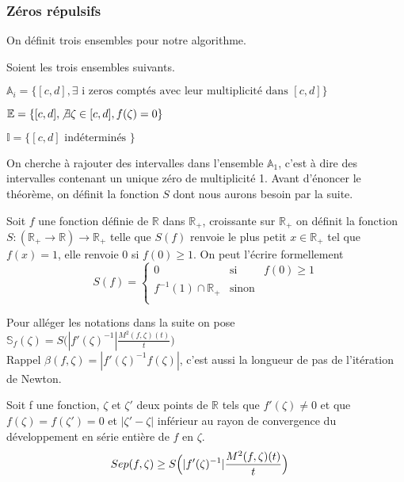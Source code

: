 \documentclass[a4paper,10.5pt]{article}
\begin{document}
	
	\subsubsection{Zéros répulsifs}
	On définit trois ensembles pour notre algorithme.
	\begin{definition} Soient les trois ensembles suivants.
		
	$\mathbb{A}_i=\{[c,d], \exists \text{ i zeros comptés avec leur multiplicité dans } [c,d]\}$
	
	$\mathbb{E}=\{[c,d], \not\exists \zeta \in [c,d], f(\zeta)=0\}$
	
	$\mathbb{I}=\{[c,d] \text{ indéterminés }\}$\\
	\end{definition}

	\noindent On cherche à rajouter des intervalles dans l'ensemble $\mathbb{A}_1$, c'est à dire des intervalles contenant un unique zéro de multiplicité 1.
	Avant d'énoncer le théorème, on définit la fonction $S$ dont nous aurons besoin par la suite. 
	\begin{definition} Soit $f$ une fonction définie de $\mathbb{R}$ dans $\mathbb{R}_+$, croissante sur $\mathbb{R}_+$ on définit la fonction $S:(\mathbb{R}_+ \rightarrow \mathbb{R}) \longrightarrow \mathbb{R}_+$  telle que $S(f)$ renvoie le plus petit $x \in \mathbb{R}_+$ tel que $f(x)=1$, elle renvoie 0 si $f(0) \geq1$. On  peut l'écrire formellement
		\begin{equation}
		S(f)=
		\left\lbrace
		\begin{array}{ccc}
		0  & \mbox{si} & f(0) \geq 1\\
		f^{-1}(1)\cap \mathbb{R}_{+} & \mbox{sinon}\\
		\end{array}\right.
		\end{equation}
	\end{definition}
	\vspace{7mm}
	Pour alléger les notations dans la suite on pose $\mathbb{S}_{f}(\zeta)=S\Big(|f'(\zeta)^{-1}|\frac{M^{2}(f,\zeta)(t)}{t}\Big)$\\
	Rappel $\beta(f,\zeta)=|f'(\zeta)^{-1}f(\zeta)|$, c'est aussi la longueur de pas de l'itération de Newton.
	\vspace{7mm}
	\begin{theorem}	Soit f une fonction, $\zeta$ et $\zeta '$ deux points de $\mathbb{R}$ tels que $f'(\zeta)\neq 0$ et que $f(\zeta)=f(\zeta ')=0$ et $|\zeta '-\zeta|$ inférieur au rayon de convergence du développement en série entière de $f$ en $\zeta$. 
		\[Sep(f,\zeta) \geq S\Big(|f'(\zeta)^{-1}|\frac{M^{2}(f,\zeta)(t)}{t}\Big) \hspace{4mm} \]
	\end{theorem}
\end{document}
